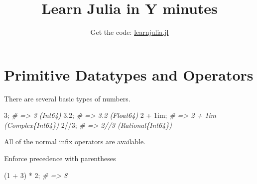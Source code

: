\documentclass[ignorenonframetext,]{beamer}
\title{Learn Julia in Y minutes}
\date{Get the code:
\href{https://learnxinyminutes.com/docs/julia/}{learnjulia.jl}}
\newenvironment{Shaded}{}{}
\newcommand{\FloatTok}[1]{\textcolor[rgb]{0.25,0.63,0.44}{{#1}}}
\newcommand{\CommentTok}[1]{\textcolor[rgb]{0.38,0.63,0.69}{\textit{{#1}}}}
\newcommand{\NormalTok}[1]{{#1}}
\begin{document}
\frame{\titlepage}

\section{Primitive Datatypes and
Operators}\label{primitive-datatypes-and-operators}

\begin{frame}[fragile]{There are several basic types of numbers.}

\begin{Shaded}
\begin{Highlighting}[]
\FloatTok{3}\NormalTok{; }\CommentTok{# => 3 (Int64)}
\FloatTok{3.2}\NormalTok{; }\CommentTok{# => 3.2 (Float64)}
\FloatTok{2} \NormalTok{+ }\FloatTok{1im}\NormalTok{; }\CommentTok{# => 2 + 1im (Complex\{Int64\})}
\FloatTok{2}\NormalTok{//}\FloatTok{3}\NormalTok{; }\CommentTok{# => 2//3 (Rational\{Int64\})}
\end{Highlighting}
\end{Shaded}

\end{frame}

\begin{frame}[fragile]{All of the normal infix operators are available.}

\begin{Shaded}
\end{Shaded}

\end{frame}

\begin{frame}[fragile]{Enforce precedence with parentheses}

\begin{Shaded}
\begin{Highlighting}[]
\NormalTok{(}\FloatTok{1} \NormalTok{+ }\FloatTok{3}\NormalTok{) * }\FloatTok{2}\NormalTok{; }\CommentTok{# => 8}
\end{Highlighting}
\end{Shaded}

\end{frame}
\end{document}
